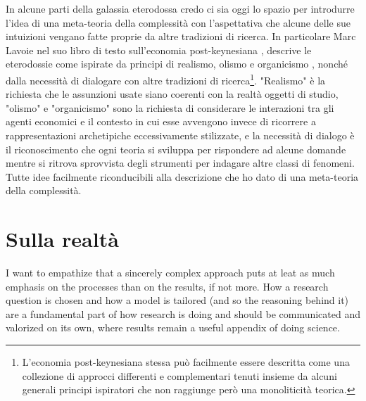 \documentclass[a4paper, headings=standardclasses]{scrartcl}
\begin{document}
In alcune parti della galassia eterodossa credo ci sia oggi lo spazio per introdurre l'idea di una meta-teoria della complessità con l'aspettativa che alcune delle sue intuizioni vengano fatte proprie da altre tradizioni di ricerca.
In particolare Marc Lavoie nel suo libro di testo sull'economia post-keynesiana \parencite{lavoie2022}, descrive le eterodossie come ispirate da principi di realismo, olismo e organicismo \parencite[][p. 12]{lavoie2022}, nonché dalla necessità di dialogare con altre tradizioni di ricerca\footnote{L'economia post-keynesiana stessa può facilmente essere descritta come una collezione di approcci differenti e complementari tenuti insieme da alcuni generali principi ispiratori che non raggiunge però una monoliticità teorica.}. "Realismo" è la richiesta che le assunzioni usate siano coerenti con la realtà oggetti di studio, "olismo" e "organicismo" sono la richiesta di considerare le interazioni tra gli agenti economici e il contesto in cui esse avvengono invece di ricorrere a rappresentazioni archetipiche eccessivamente stilizzate, e la necessità di dialogo è il riconoscimento che ogni teoria si sviluppa per rispondere ad alcune domande mentre si ritrova sprovvista degli strumenti per indagare altre classi di fenomeni.
Tutte idee facilmente riconducibili alla descrizione che ho dato di una meta-teoria della complessità. 

\section{Sulla realtà}
I want to empathize that a sincerely complex approach puts at leat as much emphasis on the processes than on the results, if not more. How a research question is chosen and how a model is tailored (and so the reasoning behind it) are a fundamental part of how research is doing and should be communicated and valorized on its own, where results remain a useful appendix of doing science.
\end{document}
